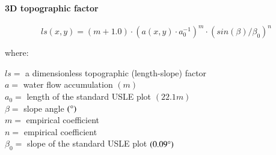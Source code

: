 \documentclass[final,3p,times,twocolumn]{elsarticle}
\begin{document}
\paragraph{3D topographic factor}


\begin{equation}
\label{eq:ls_factor}
{ls(x,y) = (m+1.0) \cdot (a(x,y) \cdot a_0^{-1})^{m} \cdot (sin(\beta) / \beta_0)^{n}}
\end{equation}

\noindent
where: 


\noindent
$ls =$ a dimensionless topographic (length-slope) factor\\
$a =$ water flow accumulation $(m)$\\
$a_0 =$ length of the standard USLE plot $(22.1 m)$\\
$\beta =$ slope angle $(\degree)$\\
$m =$ empirical coefficient\\
$n =$ empirical coefficient\\
$\beta_0 =$ slope of the standard USLE plot $(0.09 \degree)$\\
\vspace{1em}
%
\cite{mitasova_1996} %

%
%
\end{document}
